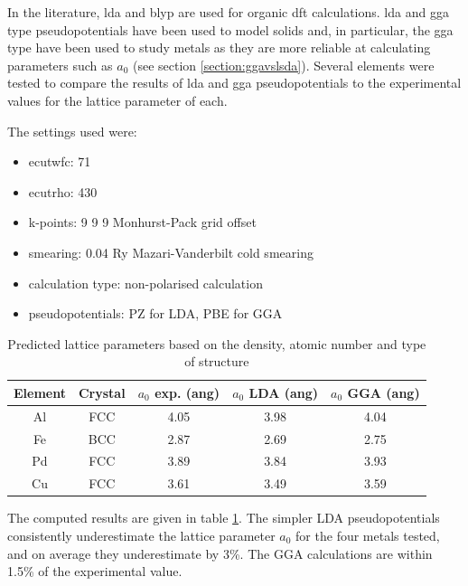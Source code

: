 In the literature, \acrshort{lda} and \acrshort{blyp} are used for organic \acrshort{dft} calculations.  \acrshort{lda} and \acrshort{gga} type pseudopotentials have been used to model solids and, in particular, the \acrshort{gga} type have been used to study metals as they are more reliable at calculating parameters such as $a_0$ (see section \ref{section:ggavslsda}).  Several elements were tested to compare the results of \acrshort{lda} and \acrshort{gga} pseudopotentials to the experimental values for the lattice parameter of each.

The settings used were:

\begin{itemize}
\item ecutwfc: 71 
\item ecutrho: 430 
\item k-points: 9 9 9 Monhurst-Pack grid offset
\item smearing: 0.04 Ry Mazari-Vanderbilt cold smearing
\item calculation type: non-polarised calculation
\item pseudopotentials: PZ for LDA, PBE for GGA
\end{itemize}

\begin{table}[h]
\begin{center}
\begin{tabular}{c c c c c}
\hline\hline
Element & Crystal & $a_0$ exp. (ang) & $a_0$ LDA (ang) & $a_0$ GGA (ang) \\
\hline\hline
Al     & FCC  &  4.05  &  3.98  &  4.04   \\ 
Fe     & BCC  &  2.87  &  2.69  &  2.75   \\ 
Pd     & FCC  &  3.89  &  3.84  &  3.93   \\ 
Cu     & FCC  &  3.61  &  3.49  &  3.59   \\ 
\hline\hline
\end{tabular}
\end{center}
\caption{Predicted lattice parameters based on the density, atomic number and type of structure}
\label{table:computedlattice}
\end{table}

The computed results are given in table \ref{table:computedlattice}.  The simpler LDA pseudopotentials consistently underestimate the lattice parameter $a_0$ for the four metals tested, and on average they underestimate by 3\%.  The GGA calculations are within 1.5\% of the experimental value.


